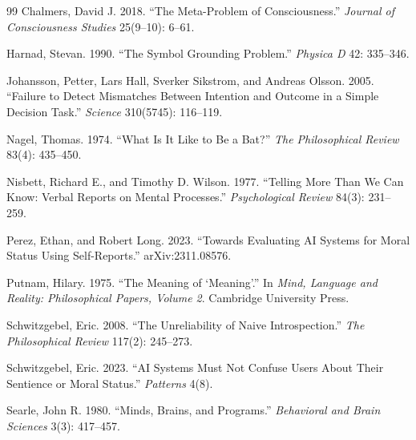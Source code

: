 \documentclass[11pt]{article}
\begin{document}
\begin{thebibliography}{99}
Chalmers, David J. 2018. ``The Meta-Problem of Consciousness.'' \textit{Journal of Consciousness Studies} 25(9--10): 6--61.

Harnad, Stevan. 1990. ``The Symbol Grounding Problem.'' \textit{Physica D} 42: 335--346.

Johansson, Petter, Lars Hall, Sverker Sikstrom, and Andreas Olsson. 2005. ``Failure to Detect Mismatches Between Intention and Outcome in a Simple Decision Task.'' \textit{Science} 310(5745): 116--119.

Nagel, Thomas. 1974. ``What Is It Like to Be a Bat?'' \textit{The Philosophical Review} 83(4): 435--450.

Nisbett, Richard E., and Timothy D. Wilson. 1977. ``Telling More Than We Can Know: Verbal Reports on Mental Processes.'' \textit{Psychological Review} 84(3): 231--259.

Perez, Ethan, and Robert Long. 2023. ``Towards Evaluating AI Systems for Moral Status Using Self-Reports.'' arXiv:2311.08576.

Putnam, Hilary. 1975. ``The Meaning of `Meaning'.'' In \textit{Mind, Language and Reality: Philosophical Papers, Volume 2}. Cambridge University Press.

Schwitzgebel, Eric. 2008. ``The Unreliability of Naive Introspection.'' \textit{The Philosophical Review} 117(2): 245--273.

Schwitzgebel, Eric. 2023. ``AI Systems Must Not Confuse Users About Their Sentience or Moral Status.'' \textit{Patterns} 4(8).

Searle, John R. 1980. ``Minds, Brains, and Programs.'' \textit{Behavioral and Brain Sciences} 3(3): 417--457.

\end{thebibliography}
\end{document}
